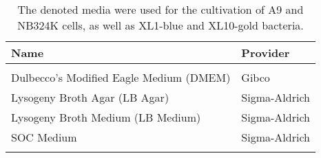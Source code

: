 \begin{center}
\begin{table}[H]
\begin{tabular}{l l}
\textbf{Name} & \textbf{Provider}\\
\hline
\\
Dulbecco's Modified Eagle Medium (DMEM) & Gibco\\
Lysogeny Broth Agar (LB Agar) & Sigma-Aldrich\\
Lysogeny Broth Medium (LB Medium) & Sigma-Aldrich\\
SOC Medium & Sigma-Aldrich\\
\\
\end{tabular}
\caption[Media]{The denoted media were used for the cultivation of A9 and NB324K cells, as well as XL1-blue and XL10-gold bacteria.}
\label{Media}
\end{table}

\end{center}